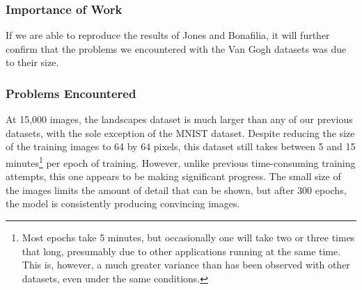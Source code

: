 \documentclass[12pt,letterpaper]{article}
\begin{document}
	\subsubsection{Importance of Work}
	If we are able to reproduce the results of Jones and Bonafilia, it will further confirm that the problems we encountered with the Van Gogh datasets was due to their size.
	\subsubsection{Problems Encountered}
	At 15,000 images, the landscapes dataset is much larger than any of our previous datasets, with the sole exception of the MNIST dataset.
	Despite reducing the size of the training images to 64 by 64 pixels, this dataset still takes between 5 and 15 minutes\footnote{Most epochs take 5 minutes, but occasionally one will take two or three times that long, presumably due to other applications running at the same time. This is, however, a much greater variance than has been observed with other datasets, even under the same conditions.} per epoch of training.
	However, unlike previous time-consuming training attempts, this one appears to be making significant progress.
	The small size of the images limits the amount of detail that can be shown, but after 300 epochs, the model is consistently producing convincing images.


\nocite{*}
\end{document}
